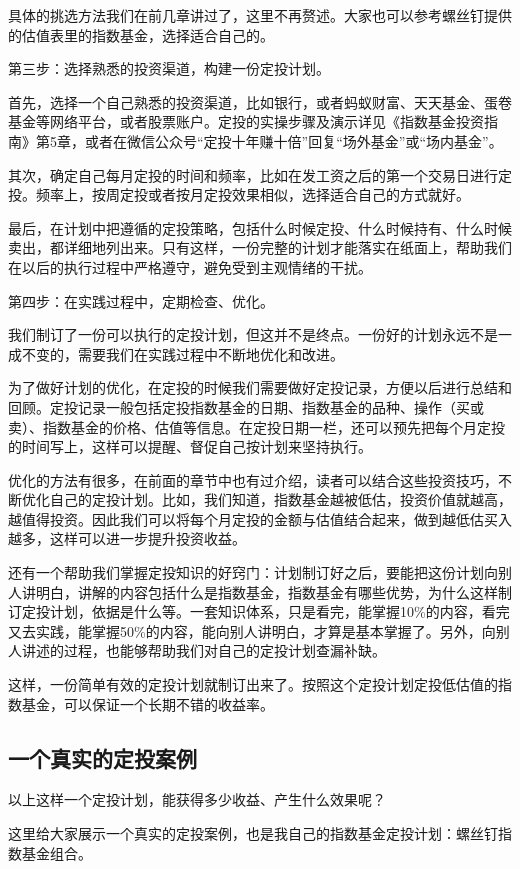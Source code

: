具体的挑选方法我们在前几章讲过了，这里不再赘述。大家也可以参考螺丝钉提供的估值表里的指数基金，选择适合自己的。

第三步：选择熟悉的投资渠道，构建一份定投计划。

首先，选择一个自己熟悉的投资渠道，比如银行，或者蚂蚁财富、天天基金、蛋卷基金等网络平台，或者股票账户。定投的实操步骤及演示详见《指数基金投资指南》第5章，或者在微信公众号“定投十年赚十倍”回复“场外基金”或“场内基金”。

其次，确定自己每月定投的时间和频率，比如在发工资之后的第一个交易日进行定投。频率上，按周定投或者按月定投效果相似，选择适合自己的方式就好。

最后，在计划中把遵循的定投策略，包括什么时候定投、什么时候持有、什么时候卖出，都详细地列出来。只有这样，一份完整的计划才能落实在纸面上，帮助我们在以后的执行过程中严格遵守，避免受到主观情绪的干扰。

第四步：在实践过程中，定期检查、优化。

我们制订了一份可以执行的定投计划，但这并不是终点。一份好的计划永远不是一成不变的，需要我们在实践过程中不断地优化和改进。

为了做好计划的优化，在定投的时候我们需要做好定投记录，方便以后进行总结和回顾。定投记录一般包括定投指数基金的日期、指数基金的品种、操作（买或卖）、指数基金的价格、估值等信息。在定投日期一栏，还可以预先把每个月定投的时间写上，这样可以提醒、督促自己按计划来坚持执行。

优化的方法有很多，在前面的章节中也有过介绍，读者可以结合这些投资技巧，不断优化自己的定投计划。比如，我们知道，指数基金越被低估，投资价值就越高，越值得投资。因此我们可以将每个月定投的金额与估值结合起来，做到越低估买入越多，这样可以进一步提升投资收益。

还有一个帮助我们掌握定投知识的好窍门：计划制订好之后，要能把这份计划向别人讲明白，讲解的内容包括什么是指数基金，指数基金有哪些优势，为什么这样制订定投计划，依据是什么等。一套知识体系，只是看完，能掌握10\%的内容，看完又去实践，能掌握50\%的内容，能向别人讲明白，才算是基本掌握了。另外，向别人讲述的过程，也能够帮助我们对自己的定投计划查漏补缺。

这样，一份简单有效的定投计划就制订出来了。按照这个定投计划定投低估值的指数基金，可以保证一个长期不错的收益率。

\subsection{一个真实的定投案例}
以上这样一个定投计划，能获得多少收益、产生什么效果呢？

这里给大家展示一个真实的定投案例，也是我自己的指数基金定投计划：螺丝钉指数基金组合。

